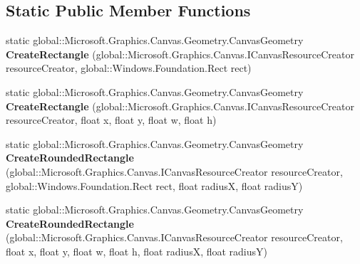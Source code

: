 \subsection*{Static Public Member Functions}
\begin{DoxyCompactItemize}
\item 
\mbox{\label{class_microsoft_1_1_graphics_1_1_canvas_1_1_geometry_1_1_canvas_geometry_a660756502ddaec1e43624023d23a5c60}} 
static global\+::\+Microsoft.\+Graphics.\+Canvas.\+Geometry.\+Canvas\+Geometry {\bfseries Create\+Rectangle} (global\+::\+Microsoft.\+Graphics.\+Canvas.\+I\+Canvas\+Resource\+Creator resource\+Creator, global\+::\+Windows.\+Foundation.\+Rect rect)
\item 
\mbox{\label{class_microsoft_1_1_graphics_1_1_canvas_1_1_geometry_1_1_canvas_geometry_a09f20f98661ef071c60ef36ee6e9c383}} 
static global\+::\+Microsoft.\+Graphics.\+Canvas.\+Geometry.\+Canvas\+Geometry {\bfseries Create\+Rectangle} (global\+::\+Microsoft.\+Graphics.\+Canvas.\+I\+Canvas\+Resource\+Creator resource\+Creator, float x, float y, float w, float h)
\item 
\mbox{\label{class_microsoft_1_1_graphics_1_1_canvas_1_1_geometry_1_1_canvas_geometry_a009788642a98b2179cad9bba9b1965dd}} 
static global\+::\+Microsoft.\+Graphics.\+Canvas.\+Geometry.\+Canvas\+Geometry {\bfseries Create\+Rounded\+Rectangle} (global\+::\+Microsoft.\+Graphics.\+Canvas.\+I\+Canvas\+Resource\+Creator resource\+Creator, global\+::\+Windows.\+Foundation.\+Rect rect, float radiusX, float radiusY)
\item 
\mbox{\label{class_microsoft_1_1_graphics_1_1_canvas_1_1_geometry_1_1_canvas_geometry_a11c20ec470232154e23df2c9cb9c10dd}} 
static global\+::\+Microsoft.\+Graphics.\+Canvas.\+Geometry.\+Canvas\+Geometry {\bfseries Create\+Rounded\+Rectangle} (global\+::\+Microsoft.\+Graphics.\+Canvas.\+I\+Canvas\+Resource\+Creator resource\+Creator, float x, float y, float w, float h, float radiusX, float radiusY)
\item 
\mbox{\label{class_microsoft_1_1_graphics_1_1_canvas_1_1_geometry_1_1_canvas_geometry_a66008979f1f25a70e38f6044abf0aca6}} 

\end{DoxyCompactItemize}
